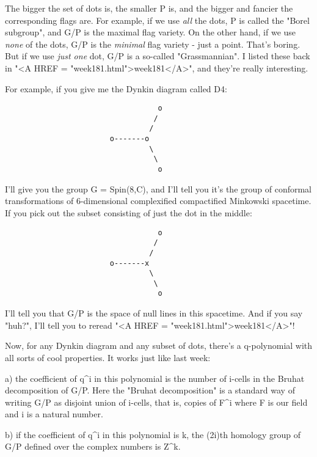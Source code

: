 The bigger the set of dots is, the smaller P is, and the bigger and
fancier the corresponding flags are.  For example, if we use
\emph{all} the dots, P is called the "Borel subgroup", and
G/P is the maximal flag variety.  On the other hand, if we use
\emph{none} of the dots, G/P is the \emph{minimal} flag variety -
just a point.  That's boring.  But if we use \emph{just one} dot, G/P
is a so-called "Grassmannian".  I listed these back in
"<A HREF = "week181.html">week181</A>", and they're really
interesting.

For example, if you give me the Dynkin diagram called D4:
  
\begin{verbatim}
                                   o 
                                  /
                                 /
                        o-------o 
                                 \
                                  \
                                   o
\end{verbatim}
    
I'll give you the group G = Spin(8,C), and I'll tell you it's the group
of conformal transformations of 6-dimensional complexified compactified
Minkowski spacetime.  If you pick out the subset consisting of just the
dot in the middle:
  
\begin{verbatim}
                                   o 
                                  /
                                 /
                        o-------x 
                                 \
                                  \
                                   o
\end{verbatim}
    
I'll tell you that G/P is the space of null lines in this spacetime.
And if you say "huh?", I'll tell you to reread "<A HREF = "week181.html">week181</A>"!

Now, for any Dynkin diagram and any subset of dots, there's a 
q-polynomial with all sorts of cool properties.  It works just like
last week: 

a) the coefficient of q^{i} in this polynomial is the number of
i-cells in the Bruhat decomposition of G/P.  Here the "Bruhat
decomposition" is a standard way of writing G/P as disjoint union
of i-cells, that is, copies of F^{i} where F is our field and i
is a natural number.

b) if the coefficient of q^{i} in this polynomial is k, the (2i)th 
homology group of G/P defined over the complex numbers is Z^{k}.

